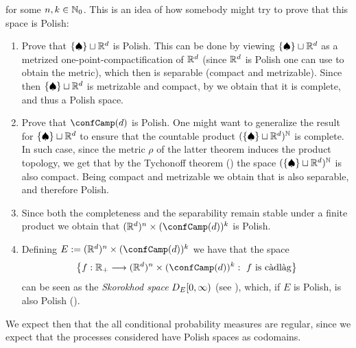 for some $n,k \in \mathbb{N}_0$.
This is an idea of how somebody might try to prove that this space is Polish:
\begin{enumerate}
	\item Prove that $\{\spadesuit\} \sqcup \mathbb{R}^d$ is Polish.
	This can be done by viewing $\{\spadesuit\} \sqcup \mathbb{R}^d$ as a metrized one-point-compactification of $\mathbb{R}^d$ (since $\mathbb{R}^d$ is Polish one can use \cite[Theorem 5.3]{kechris} to obtain the metric), which then is separable (compact and metrizable).
	Since then $\{\spadesuit\} \sqcup \mathbb{R}^d$ is metrizable and compact, by \cite[Theorem 45.1]{munkres-2000} we obtain that it is complete, and thus a Polish space.
	\item Prove that $\confCamp(d)$ is Polish. 
	One might want to generalize the result \cite[Theorem 43.4]{munkres-2000} for $\{\spadesuit\} \sqcup \mathbb{R}^d$ to ensure that the countable product $(\{\spadesuit\} \sqcup \mathbb{R}^d)^{\mathbb{N}}$ is complete.
	In such case, since the metric $\rho$ of the latter theorem induces the product topology, we get that by the Tychonoff theorem (\cite[Theorem 37.3]{munkres-2000}) the space $(\{\spadesuit\} \sqcup \mathbb{R}^d)^{\mathbb{N}}$ is also compact.
	Being compact and metrizable we obtain that is also separable, and therefore Polish.
	\item Since both the completeness and the separability remain stable under a finite product we obtain that $(\R^d)^n\times(\confCamp(d))^k$ is Polish.
	\item Defining $E:=(\R^d)^n\times(\confCamp(d))^k$ we have that the space
	\begin{equation*}
		\left\{
		f:\R_+ \longrightarrow
		(\R^d)^n\times(\confCamp(d))^k
		:\
		f \text{ is \cadlag}
		\right\}
	\end{equation*}
	can be seen as the \emph{Skorokhod space} $D_{E} [0,\infty)$ (see \cite[Chapter 3, Section 5]{kurtz}), which, if $E$ is Polish, is also Polish (\cite[Chapter 3, Theorem 5.6]{kurtz}).
\end{enumerate}

We expect then that the all conditional probability measures are regular, since we expect that the processes considered have Polish spaces as codomains.